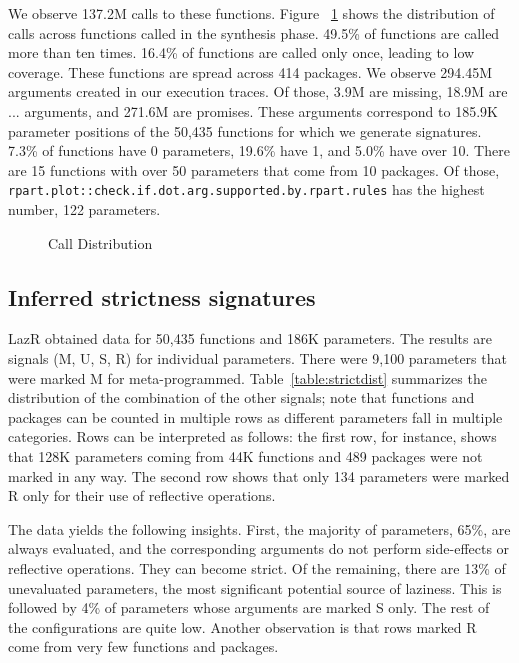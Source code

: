 \documentclass[review,creen,acmsmall]{acmart}
\renewcommand{\c}[1]{\lstinline |#1|\xspace}
\newcommand{\lazr}{{\sf LazR}\xspace}
\begin{document}
We observe 137.2M calls to these functions. Figure ~\ref{fig:callDist} shows the
distribution of calls across functions called in the synthesis
phase. 49.5\% of functions are called more than ten times. 16.4\% of functions are
called only once, leading to low coverage. These functions are spread across 414
packages.
We observe 294.45M arguments created in our execution traces. Of those, 3.9M are
missing, 18.9M are $...$ arguments, and 271.6M are promises. These arguments
correspond to 185.9K parameter positions of the 50,435 functions for which we
generate signatures.
7.3\% of functions have 0 parameters, 19.6\% have 1, and 5.0\% have over 10. There
are 15 functions with over 50 parameters that come from 10 packages. Of those,
\c{rpart.plot::check.if.dot.arg.supported.by.rpart.rules} has the highest number,
122 parameters.
%
\begin{figure}[!h]
  \centering
  
  \caption{Call Distribution}
  \label{fig:callDist}
\end{figure}
%

\subsection{Inferred strictness signatures}\label{sec:results}

\lazr obtained data for 50,435 functions and 186K parameters. The results are
signals (M, U, S, R) for individual parameters. There were 9,100 parameters that
were marked M for meta-programmed. Table~\ref{table:strictdist} summarizes the
distribution of the combination of the other signals; note that functions and
packages can be counted in multiple rows as different parameters fall in
multiple categories. Rows can be interpreted as follows: the first row, for
instance, shows that 128K parameters coming from 44K functions and 489 packages
were not marked in any way. The second row shows that only 134 parameters
were marked R only for their use of reflective operations.

The data yields the following insights. First, the majority of parameters, 65\%,
are always evaluated, and the corresponding arguments do not perform
side-effects or reflective operations. They can become strict. Of the remaining,
there are 13\% of unevaluated parameters, the most significant potential source of
laziness. This is followed by 4\% of parameters whose arguments are marked S
only. The rest of the configurations are quite low. Another observation is that
rows marked R come from very few functions and packages.
\end{document}
